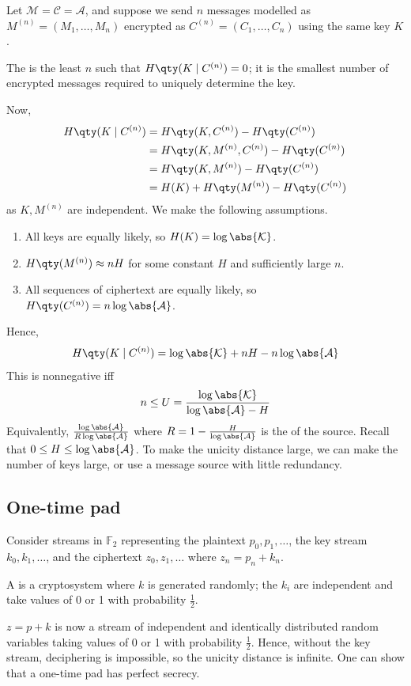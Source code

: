 Let $\mathcal M = \mathcal C = \mathcal A$, and suppose we send $n$ messages modelled as $M^{(n)} = (M_1, \dots, M_n)$ encrypted as $C^{(n)} = (C_1, \dots, C_n)$ using the same key $K$.
\begin{definition}
    The  is the least $n$ such that $H\qty(K \mid C^{(n)}) = 0$; it is the smallest number of encrypted messages required to uniquely determine the key.
\end{definition}
Now,
\begin{align*}
    H\qty(K \mid C^{(n)}) &= H\qty(K, C^{(n)}) - H\qty(C^{(n)}) \\
    &= H\qty(K, M^{(n)}, C^{(n)}) - H\qty(C^{(n)}) \\
    &= H\qty(K, M^{(n)}) - H\qty(C^{(n)}) \\
    &= H(K) + H\qty(M^{(n)}) - H\qty(C^{(n)})
\end{align*}
as $K, M^{(n)}$ are independent.
We make the following assumptions.
\begin{enumerate}
    \item All keys are equally likely, so $H(K) = \log \abs{\mathcal K}$.
    \item $H\qty(M^{(n)}) \approx nH$ for some constant $H$ and sufficiently large $n$.
    \item All sequences of ciphertext are equally likely, so $H\qty(C^{(n)}) = n \log \abs{\mathcal A}$.
\end{enumerate}
Hence,
\begin{align*}
    H\qty(K \mid C^{(n)}) = \log \abs{\mathcal K} + nH - n \log \abs{\mathcal A}
\end{align*}
This is nonnegative iff
\begin{align*}
    n \leq U = \frac{\log \abs{\mathcal K}}{\log \abs{\mathcal A} - H}
\end{align*}
Equivalently, $\frac{\log \abs{\mathcal A}}{R\log \abs{\mathcal A}}$ where $R = 1 - \frac{H}{\log \abs{\mathcal A}}$ is the  of the source.
Recall that $0 \leq H \leq \log \abs{\mathcal A}$.
To make the unicity distance large, we can make the number of keys large, or use a message source with little redundancy.

\subsection{One-time pad}
Consider streams in $\mathbb F_2$ representing the plaintext $p_0, p_1, \dots$, the key stream $k_0, k_1, \dots$, and the ciphertext $z_0, z_1, \dots$ where $z_n = p_n + k_n$.
\begin{definition}
    A  is a cryptosystem where $k$ is generated randomly; the $k_i$ are independent and take values of 0 or 1 with probability $\frac{1}{2}$.
\end{definition}
$z = p + k$ is now a stream of independent and identically distributed random variables taking values of 0 or 1 with probability $\frac{1}{2}$.
Hence, without the key stream, deciphering is impossible, so the unicity distance is infinite.
One can show that a one-time pad has perfect secrecy.

